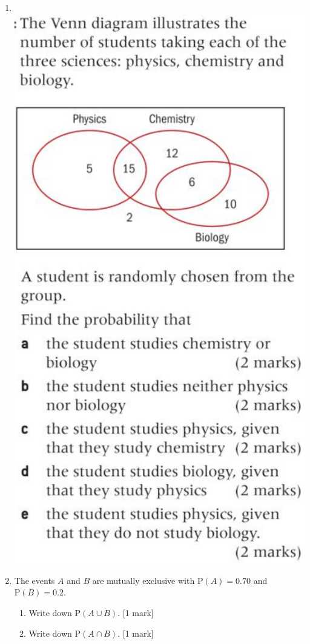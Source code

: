 \documentclass[12pt, twoside]{article}
\begin{document}
\begin{enumerate}
\newpage
\item \; \\
    \includegraphics[scale=0.5]{../graphics/problem15-p374.png} \vspace{2cm}

\item The events $A$ and $B$ are mutually exclusive with $\mathrm P(A)=0.70$ and $\mathrm P(B)=0.2$.
    \begin{enumerate}[itemsep=1.5cm]
        \item Write down $\mathrm P(A \cup B)$. \hfill [1 mark]
        \item Write down $\mathrm P(A \cap B)$. \hfill [1 mark]
    \end{enumerate}


\end{enumerate}
\end{document}
